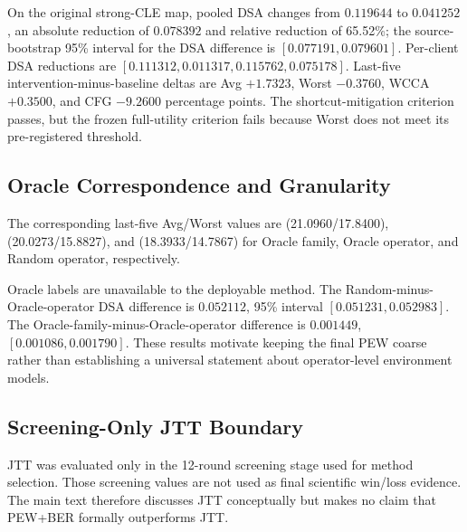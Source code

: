 On the original strong-CLE map, pooled DSA changes from \(0.119644\) to \(0.041252\), an absolute reduction of \(0.078392\) and relative reduction of 65.52\%; the source-bootstrap 95\% interval for the DSA difference is \([0.077191,0.079601]\). Per-client DSA reductions are \([0.111312,0.011317,0.115762,0.075178]\). Last-five intervention-minus-baseline deltas are Avg \(+1.7323\), Worst \(-0.3760\), WCCA \(+0.3500\), and CFG \(-9.2600\) percentage points. The shortcut-mitigation criterion passes, but the frozen full-utility criterion fails because Worst does not meet its pre-registered threshold.

\subsection{Oracle Correspondence and Granularity}



The corresponding last-five Avg/Worst values are (21.0960/17.8400),
(20.0273/15.8827), and (18.3933/14.7867) for Oracle family, Oracle
operator, and Random operator, respectively.

Oracle labels are unavailable to the deployable method. The Random-minus-Oracle-operator DSA difference is \(0.052112\), 95\% interval \([0.051231,0.052983]\). The Oracle-family-minus-Oracle-operator difference is \(0.001449\), \([0.001086,0.001790]\). These results motivate keeping the final PEW coarse rather than establishing a universal statement about operator-level environment models.

\subsection{Screening-Only JTT Boundary}

JTT was evaluated only in the 12-round screening stage used for method selection. Those screening values are not used as final scientific win/loss evidence. The main text therefore discusses JTT conceptually \citep{liu2021jtt} but makes no claim that PEW+BER formally outperforms JTT.
